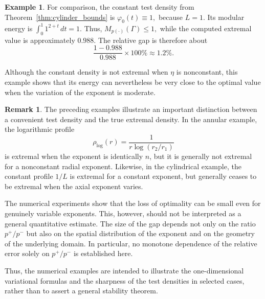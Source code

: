 \documentclass[12pt]{amsart}
\numberwithin{equation}{section}
\theoremstyle{plain}
\theoremstyle{definition}
\newtheorem{example}[equation]{Example}
\newtheorem{remark}[equation]{Remark}
\begin{document}
\begin{example}
For comparison, the constant test density from Theorem~\ref{thm:cylinder_bounds} is $\varphi_0(t)\equiv1,$ because $L=1$. Its modular energy is $\int_0^1 1^{2+t}\,dt=1.$ Thus, $M_{p(\cdot)}(\Gamma)\le1,$ while the computed extremal value is approximately $0.988$. The relative gap is therefore about
\begin{equation*}
\frac{1-0.988}{0.988}\times100\% \approx 1.2\%.
\end{equation*}

Although the constant density is not extremal when $\eta$ is nonconstant, this example shows that its energy can nevertheless be very close to the optimal value when the variation of the exponent is moderate.
\end{example}


\begin{remark}
\label{rem:gap}
The preceding examples illustrate an important distinction between a convenient test density and the true extremal density. In the annular example, the logarithmic profile
\begin{equation*}
\rho_{\log}(r)=\frac{1}{r\log(r_2/r_1)}
\end{equation*}
is extremal when the exponent is identically $n$, but it is generally not extremal for a nonconstant radial exponent. Likewise, in the cylindrical example, the constant profile $1/L$ is extremal for a constant exponent, but generally ceases to be extremal when the axial exponent varies.

The numerical experiments show that the loss of optimality can be small even for genuinely variable exponents. This, however, should not be interpreted as a general quantitative estimate. The size of the gap depends not only on the ratio $p^+/p^-$ but also on the spatial distribution of the exponent and on the geometry of the underlying domain. In particular, no monotone dependence of the relative error solely on $p^+/p^-$ is established here.

Thus, the numerical examples are intended to illustrate the one-dimensional variational formulas and the sharpness of the test densities in selected cases, rather than to assert a general stability theorem.
\end{remark}
\end{document}
